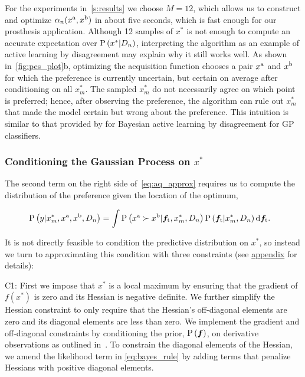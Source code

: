 For the experiments in~\cref{s:results} we choose $M = 12$, which allows us to
construct and optimize $\alpha_n(x^{\mathrm{a}}, x^{\mathrm{b}})$ in about five seconds,
which is fast enough for our prosthesis application. Although 12 samples of
$x^*$ is not enough to compute an accurate expectation over $\operatorname{P} \left( x^*|D_n \right)$,
interpreting the algorithm as an example of active learning by disagreement may
explain why it still works well.  As shown in~\cref{fig:pes_plot}b, optimizing
the acquisition function chooses a pair $x^{\mathrm{a}}$ and $x^{\mathrm{b}}$ for which the
preference is currently uncertain, but certain on average after conditioning on
all $x_m^*$. The sampled $x_m^*$ do not necessarily agree on which point is
preferred; hence, after observing the preference, the algorithm can rule out
$x_m^*$ that made the model certain but wrong about the preference. This
intuition is similar to that provided by \citep{houlsby2012collaborative} for
Bayesian active learning by disagreement for GP classifiers.

\subsubsection[Conditioning the Gaussian Process on optima]{Conditioning the
Gaussian Process on $x^*$} The second term on the right side
of~\cref{eq:aq_approx} requires us to compute the distribution of the
preference given the location of the optimum,
\begin{fullwidth}
\begin{align}
&\prob{y| x_m^*, x^\tn{a}, x^\tn{b}, D_n} =
    \int \prob{x^\tn{a} \succ x^\tn{b} | \vecf{f}[\tn{t}], x_m^*, D_n} 
    \prob{\vecf{f}[\tn{t}] | x_m^*, D_n} \tn{d} \vecf{f}[\tn{t}].
    \label{eq:predic_pref_w_constraint}
\end{align}
\end{fullwidth}
It is not directly feasible to condition the predictive distribution on $x^*$,
so instead we turn to approximating this condition with three constraints (see
\hyperlink{sec:appendix}{appendix} for details):

C1: First we impose that $x^*$ is a local maximum by ensuring that the gradient
of $f(x^*)$ is zero and its Hessian is negative definite. We further simplify
the Hessian constraint to only require that the Hessian's off-diagonal elements
are zero and its diagonal elements are less than zero. We implement the gradient
and off-diagonal constraints by conditioning the prior, $\prob{\vecf{f}}$, on
derivative observations as outlined in~\citep{solak2003derivative}. To constrain
the diagonal elements of the Hessian, we amend the likelihood term in
\cref{eq:bayes_rule} by adding terms that penalize Hessians with positive
diagonal elements.

